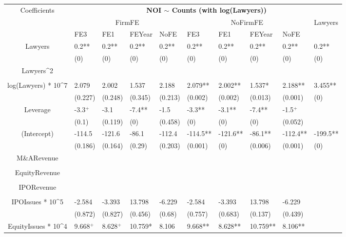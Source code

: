 \documentclass{article}
\begin{document}
\begin{table}[H]
\centering
\begin{tabular}{|clllllllll|}
\hline
\multirow{3}{*}{Coefficients} & \multicolumn{9}{c|}{\textbf{NOI $\sim$ Counts (with log(Lawyers))}} \\
\cline{2-10}
& \multicolumn{4}{c}{FirmFE} & \multicolumn{4}{c}{NoFirmFE} & \multirow{2}{*}{Lawyers} \\
\cline{2-9}
& FE3 & FE1 & FEYear & NoFE & FE3 & FE1 & FEYear & NoFE &  \\
\hline
 
Lawyers & 0.2** & 0.2** & 0.2** & 0.2** & 0.2** & 0.2** & 0.2** & 0.2** & 0.2** \\ 
   & (0) & (0) & (0) & (0) & (0) & (0) & (0) & (0) & (0) \\ 
  Lawyers^2 &  &  &  &  &  &  &  &  &  \\ 
   &  &  &  &  &  &  &  &  &  \\ 
  log(Lawyers) * 10^7 & 2.079 & 2.002 & 1.537 & 2.188 & 2.079** & 2.002** & 1.537* & 2.188** & 3.455** \\ 
   & (0.227) & (0.248) & (0.345) & (0.213) & (0.002) & (0.002) & (0.013) & (0.001) & (0) \\ 
  Leverage & -3.3$^{+}$ & -3.1 & -7.4** & -1.5 & -3.3** & -3.1** & -7.4** & -1.5$^{+}$ &  \\ 
   & (0.1) & (0.119) & (0) & (0.458) & (0) & (0) & (0) & (0.052) &  \\ 
  (Intercept) & -114.5 & -121.6 & -86.1 & -112.4 & -114.5** & -121.6** & -86.1** & -112.4** & -199.5** \\ 
   & (0.186) & (0.164) & (0.29) & (0.203) & (0.001) & (0) & (0.006) & (0.001) & (0) \\ 
  M\&ARevenue &  &  &  &  &  &  &  &  &  \\ 
   &  &  &  &  &  &  &  &  &  \\ 
  EquityRevenue &  &  &  &  &  &  &  &  &  \\ 
   &  &  &  &  &  &  &  &  &  \\ 
  IPORevenue &  &  &  &  &  &  &  &  &  \\ 
   &  &  &  &  &  &  &  &  &  \\ 
  IPOIssues * 10^5 & -2.584 & -3.393 & 13.798 & -6.229 & -2.584 & -3.393 & 13.798 & -6.229 &  \\ 
   & (0.872) & (0.827) & (0.456) & (0.68) & (0.757) & (0.683) & (0.137) & (0.439) &  \\ 
  EquityIssues * 10^4 & 9.668$^{+}$ & 8.628$^{+}$ & 10.759* & 8.106 & 9.668** & 8.628** & 10.759** & 8.106** &  \\ 

\end{tabular}
\end{table}
\end{document}
